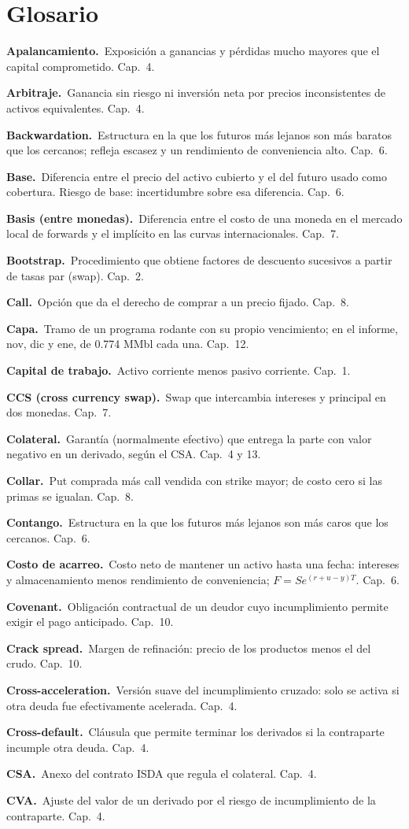 \chapter{Glosario}

\newcommand{\gl}[2]{\par\smallskip\textbf{\color{azul}#1.}\ #2}

\gl{Apalancamiento}{Exposición a ganancias y pérdidas mucho mayores que el capital comprometido. Cap.~4.}
\gl{Arbitraje}{Ganancia sin riesgo ni inversión neta por precios inconsistentes de activos equivalentes. Cap.~4.}
\gl{Backwardation}{Estructura en la que los futuros más lejanos son más baratos que los cercanos; refleja escasez y un rendimiento de conveniencia alto. Cap.~6.}
\gl{Base}{Diferencia entre el precio del activo cubierto y el del futuro usado como cobertura. Riesgo de base: incertidumbre sobre esa diferencia. Cap.~6.}
\gl{Basis (entre monedas)}{Diferencia entre el costo de una moneda en el mercado local de forwards y el implícito en las curvas internacionales. Cap.~7.}
\gl{Bootstrap}{Procedimiento que obtiene factores de descuento sucesivos a partir de tasas par (swap). Cap.~2.}
\gl{Call}{Opción que da el derecho de comprar a un precio fijado. Cap.~8.}
\gl{Capa}{Tramo de un programa rodante con su propio vencimiento; en el informe, nov, dic y ene, de 0.774 MMbl cada una. Cap.~12.}
\gl{Capital de trabajo}{Activo corriente menos pasivo corriente. Cap.~1.}
\gl{CCS (cross currency swap)}{Swap que intercambia intereses y principal en dos monedas. Cap.~7.}
\gl{Colateral}{Garantía (normalmente efectivo) que entrega la parte con valor negativo en un derivado, según el CSA. Cap.~4 y 13.}
\gl{Collar}{Put comprada más call vendida con strike mayor; de costo cero si las primas se igualan. Cap.~8.}
\gl{Contango}{Estructura en la que los futuros más lejanos son más caros que los cercanos. Cap.~6.}
\gl{Costo de acarreo}{Costo neto de mantener un activo hasta una fecha: intereses y almacenamiento menos rendimiento de conveniencia; $F=Se^{(r+u-y)T}$. Cap.~6.}
\gl{Covenant}{Obligación contractual de un deudor cuyo incumplimiento permite exigir el pago anticipado. Cap.~10.}
\gl{Crack spread}{Margen de refinación: precio de los productos menos el del crudo. Cap.~10.}
\gl{Cross-acceleration}{Versión suave del incumplimiento cruzado: solo se activa si otra deuda fue efectivamente acelerada. Cap.~4.}
\gl{Cross-default}{Cláusula que permite terminar los derivados si la contraparte incumple otra deuda. Cap.~4.}
\gl{CSA}{Anexo del contrato ISDA que regula el colateral. Cap.~4.}
\gl{CVA}{Ajuste del valor de un derivado por el riesgo de incumplimiento de la contraparte. Cap.~4.}
